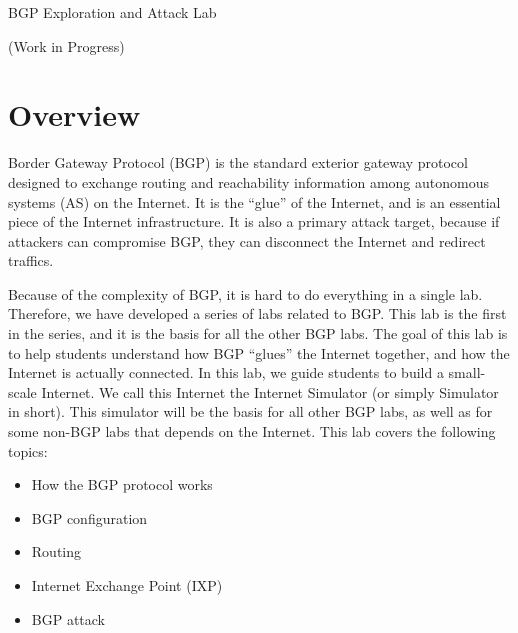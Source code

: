 
\newcommand{\commonfolder}{../../common-files}





\newcommand{\bgpFigs}{./Figs}




\begin{center}
{\LARGE BGP Exploration and Attack Lab}

  \vspace{0.1in}
  {\LARGE (Work in Progress)}
\end{center}




\section{Overview}

Border Gateway Protocol (BGP) is the standard exterior gateway protocol
designed to exchange routing and reachability information among autonomous
systems (AS) on the Internet. It is the ``glue'' of the Internet,
and is an essential piece of the Internet infrastructure. It is 
also a primary attack target, because if attackers can 
compromise BGP, they can disconnect the Internet and redirect traffics. 

Because of the complexity of BGP, it is hard to do everything in a single lab. 
Therefore, we have developed a series of labs related to BGP. This lab
is the first in the series, and it is the basis for all the other BGP labs.  
The goal of this lab is to help students understand how
BGP ``glues'' the Internet together, and how the Internet is actually
connected. In this lab, we guide students to build a small-scale Internet.
We call this Internet the Internet Simulator (or simply
Simulator in short). This simulator will be the basis for 
all other BGP labs, as well as for some non-BGP labs that 
depends on the Internet. 
This lab covers the following topics:
\begin{itemize}[noitemsep]
\item How the BGP protocol works
\item BGP configuration
\item Routing 
\item Internet Exchange Point (IXP)
\item BGP attack
\end{itemize}


